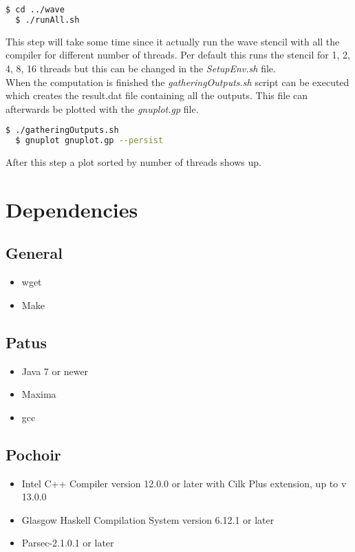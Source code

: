 \documentclass[AEJ]{AEA}
\begin{document}
\begin{lstlisting}[frame=single,language=bash]
  $ cd ../wave
  $ ./runAll.sh
\end{lstlisting}

This step will take some time since it actually run the wave stencil with all the compiler for different number of threads. Per default this runs the stencil for 1, 2, 4, 8, 16 threads but this can be changed in the \emph{SetupEnv.sh} file.
\\
When the computation is finished the \emph{gatheringOutputs.sh} script can be executed which creates the result.dat file containing all the outputs. This file can afterwards be plotted with the \emph{gnuplot.gp} file.

\begin{lstlisting}[frame=single,language=bash]
  $ ./gatheringOutputs.sh
  $ gnuplot gnuplot.gp --persist
\end{lstlisting}

After this step a plot sorted by number of threads shows up.
\newpage
\section{Dependencies}
\subsection{General}
\begin{itemize}
	\item wget
	\item Make
\end{itemize}

\subsection{Patus}
\begin{itemize}
	\item Java 7 or newer
	\item Maxima
	\item gcc
\end{itemize}
\subsection{Pochoir}

\begin{itemize}
	\item Intel C++ Compiler version 12.0.0 or later with Cilk Plus extension, up to v 13.0.0
	\item Glasgow Haskell Compilation System version 6.12.1 or later
	\item Parsec-2.1.0.1 or later
\end{itemize}
\end{document}
